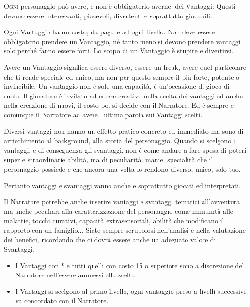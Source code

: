 \documentclass[a4paper,twoside,openany]{book}
\begin{document}
\begin{multicols}{2}

\lettrine[lines=2, lhang=0.33, loversize=0.25, findent=1.5em]{O}{gni} personaggio può avere, e non è obbligatorio averne, dei Vantaggi. Questi devono essere interessanti, piacevoli, divertenti e soprattutto giocabili.

Ogni Vantaggio ha un costo, da pagare ad ogni livello. Non deve essere obbligatorio prendere un Vantaggio, né tanto meno si devono prendere vantaggi solo perché fanno essere forti. Lo scopo di un Vantaggio è stupire e divertirsi.

Avere un Vantaggio significa essere diverso, essere un freak, avere quel particolare che ti rende speciale ed unico, ma non per questo sempre il più forte, potente o invincibile. Un vantaggio non è solo una capacità, è un'occasione di gioco di ruolo. Il giocatore è invitato ad essere creativo nella scelta dei vantaggi ed anche nella creazione di nuovi, il costo poi si decide con il Narratore. Ed è sempre e comunque il Narratore ad avere l'ultima parola sui Vantaggi scelti.

Diversi vantaggi non hanno un effetto pratico concreto ed immediato ma sono di arricchimento al background, alla storia del personaggio. Quando si scelgono i vantaggi, e di conseguenza gli svantaggi, non è come andare a fare spesa di poteri super e straordinarie abilità, ma di peculiarità, manie, specialità che il personaggio possiede e che ancora una volta lo rendono diverso, unico, solo tuo.

Pertanto vantaggi e svantaggi vanno anche e soprattutto giocati ed interpretati.

Il Narratore potrebbe anche inserire vantaggi e svantaggi tematici all'avventura ma anche  peculiari alla caratterizzazione del personaggio come immunità alle malattie, tocchi curativi, capacità extrasensoriali, abilità che modificano il rapporto con un famiglio... Siate sempre scrupolosi nell'analisi e nella valutazione dei benefici, ricordando che ci dovrà essere anche un adeguato valore di Svantaggi.


\begin{itemize}[leftmargin=*]

\item
I Vantaggi con {*} e tutti quelli con costo 15 o superiore sono a discrezione del Narratore nell'essere ammessi alla scelta.

\item
I Vantaggi si scelgono al primo livello, ogni vantaggio preso a livelli successivi va concordato con il Narratore.


\end{itemize}
\end{multicols}
\end{document}
